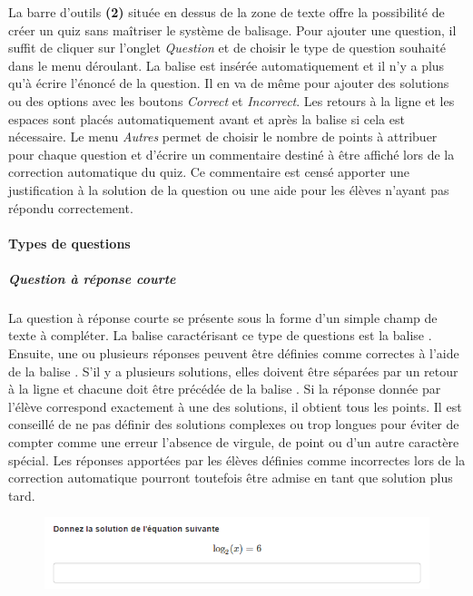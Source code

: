 \documentclass[a4,10pt,french]{sphinxmanual}
\begin{document}
La barre d'outils \textbf{(2)} située en dessus de la zone de texte offre la possibilité de créer un quiz sans maîtriser le système de balisage. Pour ajouter une question, il suffit de cliquer sur l'onglet \emph{Question} et de choisir le type de question souhaité dans le menu déroulant. La balise est insérée automatiquement et il n'y a plus qu'à écrire l'énoncé de la question. Il en va de même pour ajouter des solutions ou des options avec les boutons \emph{Correct} et \emph{Incorrect}. Les retours à la ligne et les espaces sont placés automatiquement avant et après la balise si cela est nécessaire. Le menu \emph{Autres} permet de choisir le nombre de points à attribuer pour chaque question et d'écrire un commentaire destiné à être affiché lors de la correction automatique du quiz. Ce commentaire est censé apporter une justification à la solution de la question ou une aide pour les élèves n'ayant pas répondu correctement.


\paragraph{Types de questions}
\label{doc-user:types-de-questions}

\subparagraph{Question à réponse courte}
\label{doc-user:question-a-reponse-courte}
La question à réponse courte se présente sous la forme d'un simple champ de texte à compléter. La balise caractérisant ce type de questions est la balise . Ensuite, une ou plusieurs réponses peuvent être définies comme correctes à l'aide de la balise \code{=}. S'il y a plusieurs solutions, elles doivent être séparées par un retour à la ligne et chacune doit être précédée de la balise \code{=}. Si la réponse donnée par l'élève correspond exactement à une des solutions, il obtient tous les points. Il est conseillé de ne pas définir des solutions complexes ou trop longues pour éviter de compter comme une erreur l'absence de virgule, de point ou d'un autre caractère spécial. Les réponses apportées par les élèves définies comme incorrectes lors de la correction automatique pourront toutefois être admise en tant que solution plus tard.
\begin{figure}[htbp]
\centering

\includegraphics{short.png}
\end{figure}
\end{document}
